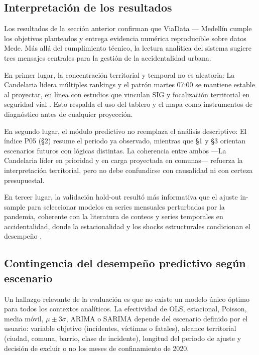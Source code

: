 \subsection{Interpretación de los resultados}

Los resultados de la sección anterior confirman que ViaData — Medellín cumple los objetivos planteados y entrega evidencia numérica reproducible sobre datos Mede. Más allá del cumplimiento técnico, la lectura analítica del sistema sugiere tres mensajes centrales para la gestión de la accidentalidad urbana.

En primer lugar, la concentración territorial y temporal no es aleatoria: La Candelaria lidera múltiples rankings y el patrón martes 07:00 se mantiene estable al proyectar, en línea con estudios que vinculan SIG y focalización territorial en seguridad vial \cite{xu2022,monar2025}. Esto respalda el uso del tablero y el mapa como instrumentos de diagnóstico antes de cualquier proyección.

En segundo lugar, el módulo predictivo no reemplaza el análisis descriptivo: El índice P05 (§2) resume el periodo ya observado, mientras que §1 y §3 orientan escenarios futuros con lógicas distintas. La coherencia entre ambos ---La Candelaria líder en prioridad y en carga proyectada en comunas--- refuerza la interpretación territorial, pero no debe confundirse con causalidad ni con certeza presupuestal.

En tercer lugar, la validación hold-out resultó más informativa que el ajuste in-sample para seleccionar modelos en series mensuales perturbadas por la pandemia, coherente con la literatura de conteos y series temporales en accidentalidad, donde la estacionalidad y los shocks estructurales condicionan el desempeño \cite{lugo2025,parraga2024}.

\subsection{Contingencia del desempeño predictivo según escenario}

Un hallazgo relevante de la evaluación es que no existe un modelo único óptimo para todos los contextos analíticos. La efectividad de OLS, estacional, Poisson, media móvil, $\mu \pm 3\sigma$, ARIMA o SARIMA depende del escenario definido por el usuario: variable objetivo (incidentes, víctimas o fatales), alcance territorial (ciudad, comuna, barrio, clase de incidente), longitud del periodo de ajuste y decisión de excluir o no los meses de confinamiento de 2020.

